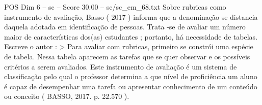 \begin{textsample}{POS Dim 6 – sc – Score 30.00 – sc/sc\_em\_68.txt}
Sobre rubricas como instrumento de avaliação, Basso ( 2017 ) informa que a denominação se distancia daquela adotada em identificação de pessoas.
Trata -se de avaliar um número maior de características dos(as) estudantes ; portanto, há necessidade de tabelas.
Escreve o autor : > Para avaliar com rubricas, primeiro se constrói uma espécie de tabela.
Nessa tabela aparecem as tarefas que se quer observar e os possíveis critérios a serem avaliados.
Este instrumento de avaliação é um sistema de classificação pelo qual o professor determina a que nível de proficiência um aluno é capaz de desempenhar uma tarefa ou apresentar conhecimento de um conteúdo ou conceito ( BASSO, 2017. p. 22.570 ).

\end{textsample}

